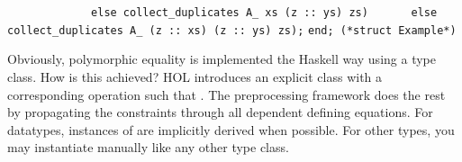 \begin{isabellebody}
\begin{isamarkuptext}
\verb|             else collect_duplicates A_ xs (z :: ys) zs)|\newline%
\verb|      else collect_duplicates A_ (z :: xs) (z :: ys) zs);|\newline%
\newline%
\verb|end; (*struct Example*)|%
\end{isamarkuptext}%
\isamarkuptrue%
%
\endisatagquoteme
{\isafoldquoteme}%
%
\isadelimquoteme
%
\endisadelimquoteme
%
\begin{isamarkuptext}%
\noindent Obviously, polymorphic equality is implemented the Haskell
  way using a type class.  How is this achieved?  HOL introduces
  an explicit class  with a corresponding operation
   such that .
  The preprocessing framework does the rest by propagating the
   constraints through all dependent defining equations.
  For datatypes, instances of  are implicitly derived
  when possible.  For other types, you may instantiate 
  manually like any other type class.


\end{isamarkuptext}
\end{isabellebody}
